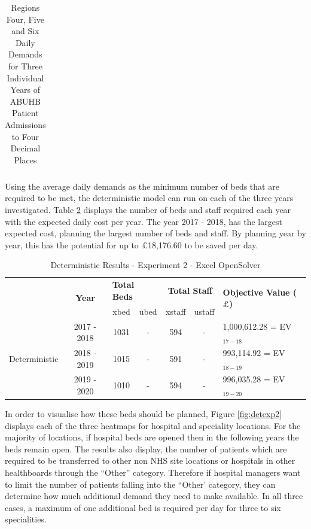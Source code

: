 \documentclass[../thesis.tex]{subfiles}
\begin{document}
\begin{landscape}
\begin{table}[h! ]
{\begin{tabular}{lcccccccccccccccccc}
    \end{tabular}}
    \caption{Regions Four, Five and Six Daily Demands for Three Individual Years of ABUHB Patient Admissions to Four Decimal Places }
    \label{tab:regionaldemandsexp2b}
\end{table}
\end{landscape}

Using the average daily demands as the minimum number of beds that are required to be met, the deterministic model can run on each of the three years investigated. Table \ref{tab:detresults2} displays the number of beds and staff required each year with the expected daily cost per year. The year 2017 - 2018, has the largest expected cost, planning the largest number of beds and staff. By planning year by year, this has the potential for up to $\pounds$18,176.60 to be saved per day. 


\begin{table}[h!]
    \centering
    \begin{tabular}{ccccccl}\toprule
 & \multirow{2}{*}{\textbf{Year}}& \multicolumn{2}{l}{\textbf{Total Beds}} & \multicolumn{2}{c}{\textbf{Total Staff}} & \multirow{2}{*}{\textbf{Objective Value ($\pounds$)}}\\ \cmidrule(lr){3-4} \cmidrule(lr){5-6}
&& xbed           & ubed          & xstaff         & ustaff         \\ \midrule
     \multirow{3}{*}{Deterministic} & 2017 - 2018 & 1031 & - &  594 & - & 1,000,612.28 =  EV$_{17-18}$ \\ 
      & 2018 - 2019 & 1015 & - & 591 & - & 993,114.92 =  EV$_{18-19}$ \\
      & 2019 - 2020 & 1010 & - & 594 & - & 996,035.28 =  EV$_{19-20}$\\ \bottomrule
    \end{tabular}
    \caption{Deterministic Results - Experiment 2 - Excel OpenSolver}
    \label{tab:detresults2}
\end{table}

In order to visualise how these beds should be planned, Figure \ref{fig:detexp2} displays each of the three heatmaps for hospital and speciality locations. For the majority of locations, if hospital beds are opened then in the following years the beds remain open. The results also display, the number of patients which are required to be transferred to other non NHS site locations or hospitals in other healthboards through the ``Other'' category. Therefore if hospital managers want to limit the number of patients falling into the ``Other' category, they can determine how much additional demand they need to make available. In all three cases, a maximum of one additional bed is required per day for three to six specialities.
\end{document}
